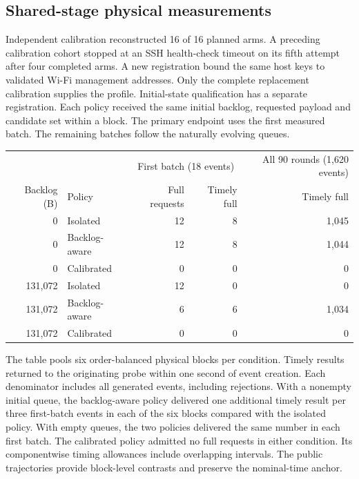 \documentclass[10pt,onecolumn]{IEEEtran}
\begin{document}
\subsection{Shared-stage physical measurements}
Independent calibration reconstructed 16 of 16 planned arms. A preceding calibration cohort stopped at an SSH health-check timeout on its fifth attempt after four completed arms. A new registration bound the same host keys to validated Wi-Fi management addresses. Only the complete replacement calibration supplies the profile. Initial-state qualification has a separate registration.
Each policy received the same initial backlog, requested payload and candidate set within a block. The primary endpoint uses the first measured batch. The remaining batches follow the naturally evolving queues.
\begin{center}
\begin{tabular}{rlrrr}\toprule
& & \multicolumn{2}{c}{First batch (18 events)} & All 90 rounds (1,620 events)\\
Backlog (B) & Policy & Full requests & Timely full & Timely full\\ \midrule
0 & Isolated & 12 & 8 & 1,045 \\
0 & Backlog-aware & 12 & 8 & 1,044 \\
0 & Calibrated & 0 & 0 & 0 \\
131,072 & Isolated & 12 & 0 & 0 \\
131,072 & Backlog-aware & 6 & 6 & 1,034 \\
131,072 & Calibrated & 0 & 0 & 0 \\
\bottomrule\end{tabular}\end{center}
The table pools six order-balanced physical blocks per condition. Timely results
returned to the originating probe within one second of event creation. Each
denominator includes all generated events, including rejections. With a nonempty
initial queue, the backlog-aware policy delivered one additional timely result per
three first-batch events in each of the six blocks compared with the isolated
policy. With empty queues, the two policies delivered the same number in each
first batch. The calibrated policy admitted no full requests in either condition.
Its componentwise timing allowances include overlapping intervals. The public
trajectories provide block-level contrasts and preserve the nominal-time anchor.


\clearpage
\end{document}
